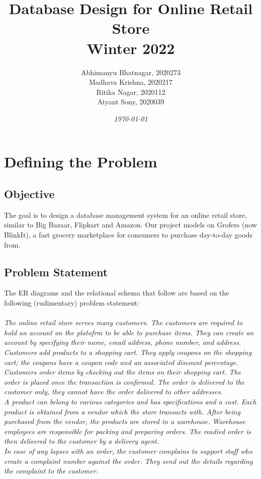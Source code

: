 \documentclass[12pt]{report}
\title{
    \textbf{Database Design for Online Retail Store\\ Winter 2022 \\}
}
\author{Abhimanyu Bhatnagar, 2020273
        \\Madhava Krishna, 2020217
        \\Ritika Nagar, 2020112
        \\Atyant Sony, 2020039}
\date{\textit{\today}}
\begin{document}
    \maketitle
    
    \tableofcontents
    \listoffigures
    \pagebreak

    \chapter{Defining the Problem}
    \section{Objective}
        The goal is to design a database management system for an online retail store,
        similar to Big Bazaar, Flipkart and Amazon. Our project models on Grofers (now BlinkIt), 
        a fast grocery marketplace for consumers to purchase day-to-day goods from.
    
    \section{Problem Statement}
    The ER diagrams and the relational schema that follow are based on the following (rudimentary) problem statement:
    \\\\
    \textit{
        The online retail store serves many customers. 
        The customers are required to hold an account on the platofrm to be able to purchase items.
        They can create an account by specifying their name, email address, phone number, and address.
        Customers add products to a shopping cart. They apply coupons on the shopping cart; the coupons 
        have a coupon code and an associated discount percentage.\\
        Customers order items by checking out the items on their shopping cart. The order is placed once the
         transaction is confirmed. The order is delivered to the customer only, 
         they cannot have the order delivered to other addresses.
        \\
        A product can belong to various categories and has specifications and a cost. Each
        product is obtained from a vendor which the store transacts with. After being purchased from 
        the vendor, the products are stored in a warehouse. Warehouse employees are responsible for packing 
        and preparing orders. The readied order is then delivered to the customer by a delivery agent.
        \\
        In case of any lapses with an order, the customer complains to support staff who create a complaint
        number against the order. They send out the details regarding the complaint to the customer.
    }
\end{document}
